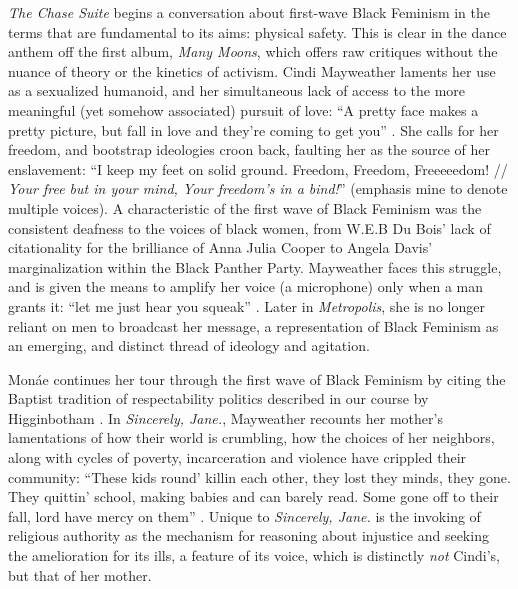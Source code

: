 \documentclass[a4paper, 11pt]{article} %
\begin{document}
\emph{The Chase Suite} begins a conversation about first-wave Black Feminism in the terms that are fundamental to its aims: physical safety.
This is clear in the dance anthem off the first album, \emph{Many Moons}, which offers raw critiques without the nuance of theory or the kinetics of activism.
Cindi Mayweather laments her use as a sexualized humanoid, and her simultaneous lack of access to the more meaningful (yet somehow associated) pursuit of love: ``A pretty face makes a pretty picture, but fall in love and they're coming to get you'' \cite{happyhunting}.
She calls for her freedom, and bootstrap ideologies croon back, faulting her as the source of her enslavement: ``I keep my feet on solid ground. Freedom, Freedom, Freeeeedom! // \emph{Your free but in your mind, Your freedom's in a bind!}'' \cite{manymoons} (emphasis mine to denote multiple voices).
A characteristic of the first wave of Black Feminism was the consistent deafness to the voices of black women, from W.E.B Du Bois' lack of citationality for the brilliance of Anna Julia Cooper to Angela Davis' marginalization within the Black Panther Party.
Mayweather faces this struggle, and is given the means to amplify her voice (a microphone) only when a man grants it: ``let me just hear you squeak'' \cite{manymoons}.
Later in \emph{Metropolis}, she is no longer reliant on men to broadcast her message, a representation of Black Feminism as an emerging, and distinct thread of ideology and agitation. 

Mon\'ae continues her tour through the first wave of Black Feminism by citing the Baptist tradition of respectability politics described in our course by Higginbotham \cite{higginbotham}.
In \emph{Sincerely, Jane.}, Mayweather recounts her mother's lamentations of how their world is crumbling, how the choices of her neighbors, along with cycles of poverty, incarceration and violence have crippled their community:
``These kids round' killin each other, they lost they minds, they gone. They quittin' school, making babies and can barely read. Some gone off to their fall, lord have mercy on them'' \cite{sincerelyjane}. 
Unique to \emph{Sincerely, Jane.} is the invoking of religious authority as the mechanism for reasoning about injustice and seeking the amelioration for its ills, a feature of its voice, which is distinctly \emph{not} Cindi's, but that of her mother.
\end{document}
